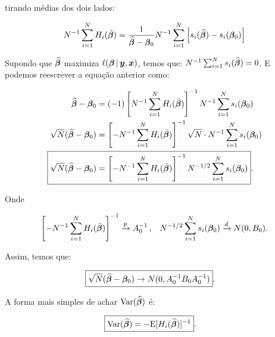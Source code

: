 \documentclass[11pt, oneside, a4paper, article]{article}
\numberwithin{equation}{section}
\begin{document}
\begin{description}
\begin{description}
\noindent
tirando médias dos dois lados:

\vspace{-1 em}
\begin{align*}
N^{-1} \sum_{i=1}^{N} 
H_{i} ( \bar{\boldsymbol{\beta}} ) 
=
\frac{1}{\widehat{\boldsymbol{\beta}} - \boldsymbol{\beta}_{0}}
N^{-1} \sum_{i=1}^{N} 
\left[ 
s_{i}( \widehat{\boldsymbol{\beta}} ) - s_{i}( \boldsymbol{\beta}_{0} )
\right]
\end{align*}

Supondo que
$\widehat{\boldsymbol{\beta}}$
maximiza
$\ell (\boldsymbol{\beta} \, | \, \boldsymbol{y}, \boldsymbol{x})$,
temos que:
$N^{-1} \sum_{i=1}^{N} s_{i}(\widehat{\boldsymbol{\beta}}) = 0$.
E podemos reescrever a equação anterior como:

\vspace{-1 em}
\begin{align*}
\widehat{\mbs{\beta}} - \mbs{\beta}_{0}
&=
(-1)
\left[ N^{-1} \sum_{i=1}^{N} H_{i} ( \bar{\mbs{\beta}} ) \right]^{-1}
N^{-1} \sum_{i=1}^{N} s_{i}( \mbs{\beta}_{0} ) 
\\
\sqrt{N} ( \widehat{\mbs{\beta}} - \mbs{\beta}_{0} )
&=
\left[
- N^{-1} \sum_{i=1}^{N} H_{i} ( \bar{\mbs{\beta}} )
\right]^{-1}
\sqrt{N} \cdot N^{-1} \sum_{i=1}^{N} s_{i}( \mbs{\beta}_{0} ) 
\\
\Aboxed{
\sqrt{N} ( \widehat{\mbs{\beta}} - \mbs{\beta}_{0} )
&=
\left[
- N^{-1} \sum_{i=1}^{N} H_{i} ( \bar{\mbs{\beta}} )
\right]^{-1}
N^{-1/2} \sum_{i=1}^{N} s_{i}( \mbs{\beta}_{0} ) }.
\end{align*}

\noindent
Onde

\vspace{-1 em}
\begin{align*}
\left[ 
- N^{-1} \sum_{i=1}^{N}
H_{i} ( \bar{\boldsymbol{\beta}} ) \right]^{-1}
\xrightarrow{p}
A_{0}^{-1} \, ,
&&
N^{-1/2} \sum_{i=1}^{N} s_{i}( \boldsymbol{\beta}_{0} ) 
\xrightarrow{d}
N( 0, B_{0} ).
\end{align*}

\noindent
Assim, temos que:

\vspace{-1 em}
\begin{align*}
\Aboxed{
\sqrt{N} ( \widehat{\mbs{\beta}} - \mbs{\beta}_{0} )
\to
N ( 0, A_{0}^{-1} B_{0} A_{0}^{-1} )}.
\end{align*}

A forma mais simples de achar $\text{Var} ( {\widehat{\boldsymbol{\beta}}} )$ é:

\vspace{-1 em}
\begin{align*}
	\Aboxed{
\Var( \widehat{\mbs{\beta}} )
&=
- \E[ H_{i} ( \widehat{\mbs{\beta}} ) ]^{-1} }.
\end{align*}


\end{description}
\end{description}
\end{document}
